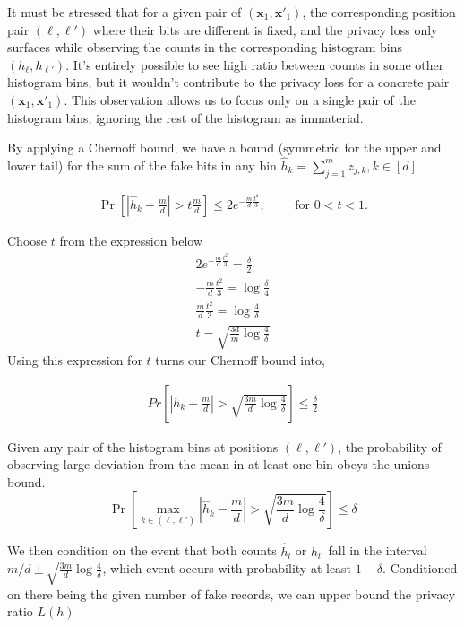 \documentclass[11pt]{article}
\newcommand{\bbx}{\pmb{x}}
\begin{document}
It must be stressed that for a given pair of $(\bbx_1, \bbx'_1)$, the corresponding position pair $(\ell,\ell')$ where their bits are different is fixed, and the privacy loss only surfaces while observing the counts in the corresponding histogram bins $(h_\ell, h_{\ell'})$.  It's entirely possible to see high ratio between counts in some other histogram bins, but it wouldn't contribute to the privacy loss for a concrete pair $(\bbx_1, \bbx'_1)$.  This observation allows us to focus only on a single pair of the histogram bins, ignoring the rest of the histogram as immaterial.  

By applying a Chernoff bound, we have a bound (symmetric for the upper and lower tail) for the sum of the fake bits in any bin $\hat{h}_k = \sum^m_{j=1} z_{j,k},  k \in [d]$

\begin{align*}
 \Pr \left [ \left | \hat{h}_k - \frac{m}{d} \right | > t \frac{m}{d} \right ]  \le 2 e^{- \frac{m}{d} \frac{t^2}{3}}, \qquad \text{ for  } 0 < t < 1.
\end{align*}

Choose $t$ from the expression below
\begin{align*}
2e^{- \frac{m}{d} \frac{t^2}{3}} = \frac{\delta}{2}  \\
- \frac{m}{d} \frac{t^2}{3} = \log{\frac{\delta}{4}}  \\
 \frac{m}{d} \frac{t^2}{3} = \log{\frac{4}{\delta}} \\
 t = \sqrt{  \frac{3d}{m} \log{\frac{4}{\delta}} }
\end{align*}
Using this expression for $t$ turns our Chernoff bound into,
 
 \begin{align}
 Pr \left [ \left | \bar{h}_k - \frac{m}{d} \right | >  \sqrt{  \frac{3m}{d} \log{\frac{4}{\delta}} } \right ]  \le \frac{\delta}{2}
\end{align}

Given any pair of the histogram bins at positions $(\ell,\ell')$, the probability of observing large deviation from the mean in at least one bin obeys the unions bound.
\[
\Pr \left [ \max_{k \in (\ell,\ell')} \left | \hat{h}_k - \frac{m}{d} \right | >  \sqrt{  \frac{3m}{d} \log{\frac{4}{\delta}} } \right ]  \le \delta
\]

We then condition on the event that both counts $\hat{h}_l$ or $\hat{h}_{l'}$ fall in the interval $m/d \pm \sqrt{  \frac{3m}{d} \log{\frac{4}{\delta}}}$, which event occurs with probability at least $1 - \delta$.  
Conditioned on there being the given number of fake records, we can upper bound the privacy ratio $L(h)$
\end{document}
